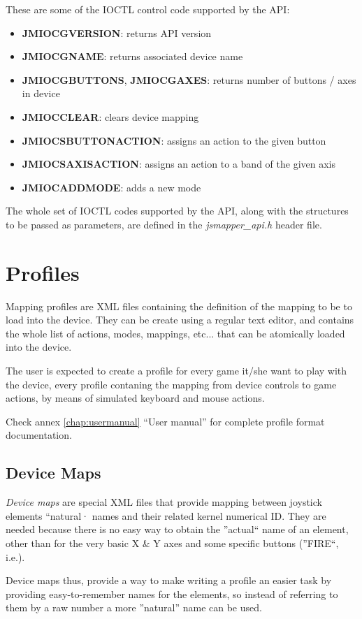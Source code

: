These are some of the IOCTL control code supported by the API:
\begin{itemize}
 \item \textbf{JMIOCGVERSION}: returns API version
 \item \textbf{JMIOCGNAME}: returns associated device name
 \item \textbf{JMIOCGBUTTONS}, \textbf{JMIOCGAXES}: returns number of buttons / axes in device
 \item \textbf{JMIOCCLEAR}: clears device mapping
 \item \textbf{JMIOCSBUTTONACTION}: assigns an action to the given button
 \item \textbf{JMIOCSAXISACTION}: assigns an action to a band of the given axis
 \item \textbf{JMIOCADDMODE}: adds a new mode
\end{itemize}

The whole set of IOCTL codes supported by the API, along with the structures to be passed as parameters, are defined in the \emph{jsmapper\_api.h} header file.


\section{Profiles}
Mapping profiles are XML files containing the definition of the mapping to be to load into the device. They can be create using a regular text editor, and contains the whole list of actions, modes, mappings, etc... that can be atomically loaded into the device.

The user is expected to create a profile for every game it/she want to play with the device, every profile contaning the mapping from device controls to game actions, by means of simulated keyboard and mouse actions.

Check annex \ref{chap:usermanual} ``User manual'' for complete profile format documentation.


\subsection{Device Maps}
\emph{Device maps} are special XML files that provide mapping between joystick elements ``natural· names and their related kernel numerical ID. They are needed because there is no easy way to obtain the ''actual`` name of an element, other than for the very basic X \& Y axes and some specific buttons (''FIRE``, i.e.).

Device maps thus, provide a way to make writing a profile an easier task by providing easy-to-remember names for the elements, so instead of referring to them by a raw number a more ''natural'' name can be used.

